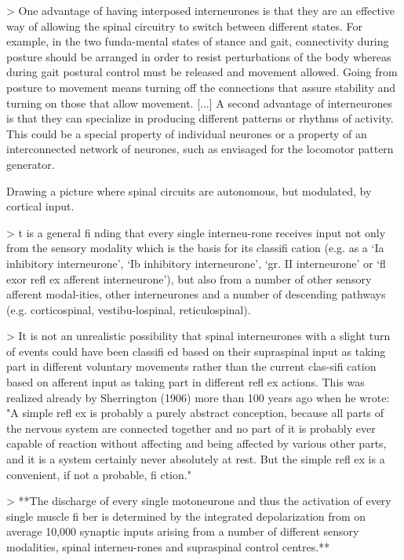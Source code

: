 \documentclass[../main.tex]{subfiles}
\begin{document}
{{{> One  advantage  of  having  interposed  interneurones  is  that  they  are  an  effective  way  of  allowing the spinal circuitry to switch between different states. For example, in the two funda-mental states of stance and gait, connectivity during posture should be arranged in order to resist perturbations of the body whereas during gait postural control must be released and movement allowed. Going from posture to movement means turning off the connections that assure stability and turning on those that allow movement. [...] A  second  advantage  of  interneurones  is  that  they  can  specialize  in  producing  different  patterns or rhythms of activity. This could be a special property of individual neurones or a property  of  an  interconnected  network  of  neurones,  such  as  envisaged  for  the  locomotor  pattern generator.

Drawing a picture where spinal circuits are autonomous, but modulated, by cortical input. 

> t is a general fi nding that every single interneu-rone receives input not only from the sensory modality which is the basis for its classifi cation (e.g.  as  a  ‘Ia  inhibitory  interneurone’,  ‘Ib  inhibitory  interneurone’,  ‘gr.  II  interneurone’  or  ‘fl exor refl ex afferent interneurone’), but also from a number of other sensory afferent modal-ities, other interneurones and a number of descending pathways (e.g. corticospinal, vestibu-lospinal, reticulospinal).

> It is not an unrealistic possibility that spinal interneurones with a slight turn of events could have been classifi ed based on their supraspinal input as taking part in different voluntary movements rather than the current clas-sifi cation based on afferent input as taking part in different refl ex actions. This was realized already by Sherrington (1906) more than 100 years ago when he wrote: "A  simple  refl  ex  is  probably  a  purely  abstract  conception,  because  all  parts  of  the  nervous system are connected together and no part of it is probably ever capable of reaction  without  affecting  and  being  affected  by  various  other  parts,  and  it  is  a  system certainly never absolutely at rest. But the simple refl ex is a convenient, if not a probable, fi ction."

> **The discharge of every single motoneurone and thus the activation of every  single  muscle  fi ber is determined by the integrated depolarization from on average 10,000 synaptic inputs arising from a number of different sensory modalities, spinal interneu-rones and supraspinal control centres.**

}}}
\end{document}

